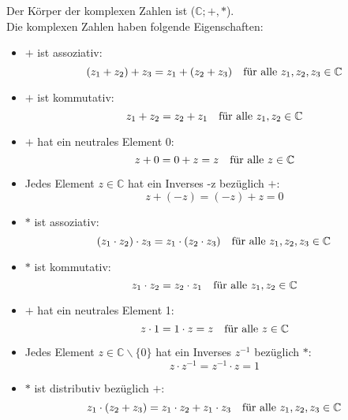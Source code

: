 \documentclass{article}
\newcommand{\mesp}{\phantom{\hspace{10px}}}
\newcommand{\C}{\mathbb{C}}
\begin{document}
Der Körper der komplexen Zahlen ist ($\C; +, *$).\\
Die komplexen Zahlen haben folgende Eigenschaften:
\begin{itemize}
    \item $+$ ist assoziativ:
        \begin{equation*}
            (z_1 + z_2) + z_3 = z_1 + (z_2 + z_3) \mesp \text{für alle } z_1, z_2, z_3 \in \C
        \end{equation*}
    \item $+$ ist kommutativ:
        \begin{equation*}
            z_1 + z_2 = z_2 + z_1 \mesp \text{für alle } z_1, z_2 \in \C
        \end{equation*}
    \item $+$ hat ein neutrales Element 0:
        \begin{equation*}
            z + 0 = 0 + z = z \mesp \text{für alle } z \in \C 
        \end{equation*}
    \item Jedes Element $z \in \C$ hat ein Inverses -z bezüglich $+$:
        \begin{equation*}
            z + (-z) = (-z) + z = 0
        \end{equation*}
    \item $*$ ist assoziativ:
        \begin{equation*}
            (z_1 \cdot z_2) \cdot z_3 = z_1 \cdot (z_2 \cdot z_3) \mesp \text{für alle } z_1, z_2, z_3 \in \C
        \end{equation*}
    \item $*$ ist kommutativ:
        \begin{equation*}
            z_1 \cdot z_2 = z_2 \cdot z_1 \mesp \text{für alle } z_1, z_2 \in \C
        \end{equation*}
    \item $+$ hat ein neutrales Element 1:
        \begin{equation*}
            z \cdot 1 = 1 \cdot z = z \mesp \text{für alle } z \in \C 
        \end{equation*}
    \item Jedes Element $z \in \C \backslash \{0\}$ hat ein Inverses $z^{-1}$ bezüglich $*$:
        \begin{equation*}
            z \cdot z^{-1} = z^{-1} \cdot z = 1
        \end{equation*}
    \item $*$ ist distributiv bezüglich $+$:
        \begin{equation*}
            z_1 \cdot (z_2 + z_3) = z_1 \cdot z_2 + z_1 \cdot z_3 \mesp \text{für alle } z_1, z_2, z_3 \in \C
        \end{equation*}
\end{itemize}
\end{document}
